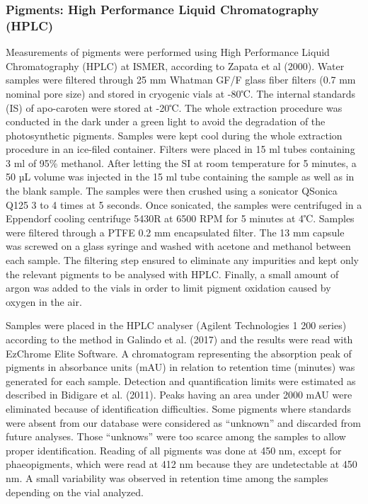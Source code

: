 \documentclass[essd, manuscript]{copernicus}
\begin{document}
\subsubsection{Pigments: High Performance Liquid Chromatography (HPLC)}
Measurements of pigments were performed using High Performance Liquid Chromatography (HPLC) at ISMER, according to Zapata et al (2000). Water samples were filtered through 25 mm Whatman GF/F glass fiber filters (0.7 mm nominal pore size) and stored in cryogenic vials at -80℃. The internal standards (IS) of apo-caroten were stored at -20℃. The whole extraction procedure was conducted in the dark under a green light to avoid the degradation of the photosynthetic pigments. Samples were kept cool during the whole extraction procedure in an ice-filed container. Filters were placed in 15 ml tubes containing 3 ml of 95\% methanol. After letting the SI at room temperature for 5 minutes, a 50 µL volume was injected in the 15 ml tube containing the sample as well as in the blank sample. The samples were then crushed using a sonicator QSonica Q125 3 to 4 times at 5 seconds.  Once sonicated, the samples were centrifuged in a Eppendorf cooling centrifuge 5430R at 6500 RPM for 5 minutes at 4℃. Samples were filtered through a PTFE 0.2 mm encapsulated filter. The 13 mm capsule was screwed on a glass syringe and washed with acetone and methanol between each sample. The filtering step ensured to eliminate any impurities and kept only the relevant pigments to be analysed with HPLC. Finally, a small amount of argon was added to the vials in order to limit pigment oxidation caused by oxygen in the air.
 
Samples were placed in the HPLC analyser (Agilent Technologies 1 200 series) according to the method in Galindo et al. (2017) and the results were read with EzChrome Elite Software. A chromatogram representing the absorption peak of pigments in absorbance units (mAU) in relation to retention time (minutes) was generated for each sample. Detection and quantification limits were estimated as described in Bidigare et al. (2011). Peaks having an area under 2000 mAU were eliminated because of identification difficulties. Some pigments where standards were absent from our database were considered as “unknown” and discarded from future analyses. Those “unknows” were too scarce among the samples to allow proper identification. Reading of all pigments was done at 450 nm, except for phaeopigments, which were read at 412 nm because they are undetectable at 450 nm. A small variability was observed in retention time among the samples depending on the vial analyzed.
 
\end{document}
